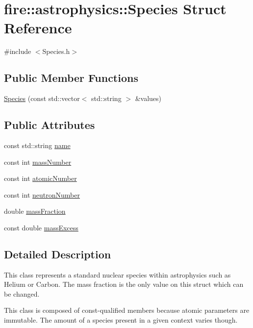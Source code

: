 \hypertarget{a00028}{}\section{fire\+:\+:astrophysics\+:\+:Species Struct Reference}
\label{a00028}


{\ttfamily \#include $<$Species.\+h$>$}

\subsection*{Public Member Functions}
\begin{DoxyCompactItemize}
\item 
\hyperlink{a00028_ac3c237025b5bcd786519dfbf398f86d3}{Species} (const std\+::vector$<$ std\+::string $>$ \&values)
\end{DoxyCompactItemize}
\subsection*{Public Attributes}
\begin{DoxyCompactItemize}
\item 
const std\+::string \hyperlink{a00028_a4aea10c6b155eaeeb52dedcef2dcf849}{name}
\item 
const int \hyperlink{a00028_a403a85b9ffb625643b0bd5cf2e944376}{mass\+Number}
\item 
const int \hyperlink{a00028_a01796faa4262d2225c4cf3b714afde81}{atomic\+Number}
\item 
const int \hyperlink{a00028_acd295953eb640a1354df0be96e63f1cd}{neutron\+Number}
\item 
double \hyperlink{a00028_aa23c930af303e0c2b09491b18888855b}{mass\+Fraction}
\item 
const double \hyperlink{a00028_a3fd8c01bcbb27c20fb80cf9a9e6e1f66}{mass\+Excess}
\end{DoxyCompactItemize}


\subsection{Detailed Description}
This class represents a standard nuclear species within astrophysics such as Helium or Carbon. The mass fraction is the only value on this struct which can be changed.

This class is composed of const-\/qualified members because atomic parameters are immutable. The amount of a species present in a given context varies though. 

